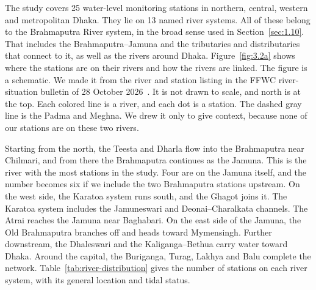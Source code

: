 The study covers 25 water-level monitoring stations in northern, central, western
and metropolitan Dhaka. They lie on 13 named river systems. All of these belong
to the Brahmaputra River system, in the broad sense used in
Section~\ref{sec:1.10}. That includes the Brahmaputra--Jamuna and the tributaries
and distributaries that connect to it, as well as the rivers around Dhaka.
Figure~\ref{fig:3.2a} shows where the stations are on their rivers and how the
rivers are linked. The figure is a schematic. We made it from the river and
station listing in the FFWC river-situation bulletin of 28 October
2026~\cite{ffwc_website}. It is not drawn to scale, and north is at the top. Each
colored line is a river, and each dot is a station. The dashed gray line is the
Padma and Meghna. We drew it only to give context, because none of our stations
are on these two rivers.

Starting from the north, the Teesta and Dharla flow into the Brahmaputra near
Chilmari, and from there the Brahmaputra continues as the Jamuna. This is the
river with the most stations in the study. Four are on the Jamuna itself, and the
number becomes six if we include the two Brahmaputra stations upstream. On the
west side, the Karatoa system runs south, and the Ghagot joins it. The Karatoa
system includes the Jamuneswari and Deonai--Charalkata channels. The Atrai
reaches the Jamuna near Baghabari. On the east side of the Jamuna, the Old
Brahmaputra branches off and heads toward Mymensingh. Further downstream, the
Dhaleswari and the Kaliganga--Bethua carry water toward Dhaka. Around the
capital, the Buriganga, Turag, Lakhya and Balu complete the network.
Table~\ref{tab:river-distribution} gives the number of stations on each river
system, with its general location and tidal status.


